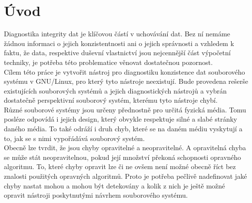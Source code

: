 \chapter*{Úvod}
{}

Diagnostika integrity dat je klíčovou částí v uchovávání dat. Bez ní nemáme žádnou informaci o jejich konzistentnosti ani o jejich správnosti a vzhledem k faktu, že data, respektive duševní vlastnictví jsou nejcennější část výpočetní techniky, je potřeba této problematice věnovat dostatečnou pozornost.\\
Cílem této práce je vytvořit nástroj pro diagnostiku konzistence dat souborového systému v GNU/Linux, pro který tyto nástroje neexistují. Bude provedena rešerše existujících souborových systémů a jejich diagnostických nástrojů a vybrán dostatečně perspektivní souborový systém, kterému tyto nástroje chybí.\\
Různé souborové systémy jsou určeny přednostně pro určitá fyzická média. Tomu posléze odpovídá i jejich design, který obvykle respektuje silné a slabé stránky daného média. To také odráží i druh chyb, které se na daném médiu vyskytují a to, jak se s nimi vypořádává souborový systém.\\
Obecně lze tvrdit, že jsou chyby opravitelné a neopravitelné. A opravitelná chyba se může stát neopravitelnou, pokud její množství překoná schopnosti opravného algoritmu. To, které chyby opravit lze či ne ovšem není možné obecně říct bez znalosti použitých opravných algoritmů. Proto je potřeba pečlivě nadefinovat jaké chyby nastat mohou a mohou být detekovány a kolik z nich je ještě možné opravit nástroji poskytnutými návrhem souborového systému. 
